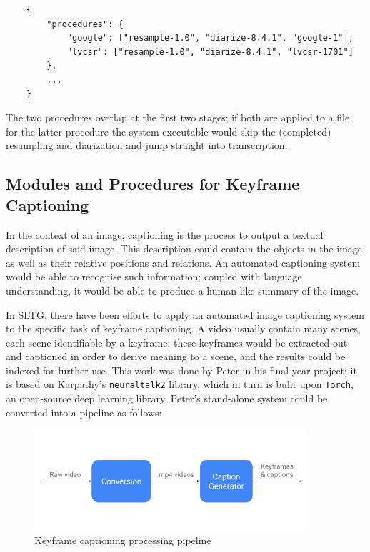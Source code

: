 \begin{lstlisting}
    {
        "procedures": {
            "google": ["resample-1.0", "diarize-8.4.1", "google-1"],
            "lvcsr": ["resample-1.0", "diarize-8.4.1", "lvcsr-1701"]
        },
        ...
    }
\end{lstlisting}

The two procedures overlap at the first two stages; if both are applied to a file, for the latter procedure the system executable would skip the (completed) resampling and diarization and jump straight into transcription.

\subsection{Modules and Procedures for Keyframe Captioning}

In the context of an image, captioning is the process to output a textual description of said image. This description could contain the objects in the image as well as their relative positions and relations. An automated captioning system would be able to recognise such information; coupled with language understanding, it would be able to produce a human-like summary of the image.

In SLTG, there have been efforts to apply an automated image captioning system to the specific task of keyframe captioning. A video usually contain many scenes, each scene identifiable by a keyframe; these keyframes would be extracted out and captioned in order to derive meaning to a scene, and the results could be indexed for further use. This work was done by Peter in his final-year project; it is based on Karpathy's \texttt{neuraltalk2} library, which in turn is bulit upon \texttt{Torch}, an open-source deep learning library. Peter's stand-alone system could be converted into a pipeline as follows:

\begin{figure}[h]
\begin{center}
    \includegraphics[width=0.9\textwidth]{../images/pipeline_capgen.png}
    \caption{Keyframe captioning processing pipeline}
\end{center}
\end{figure}

